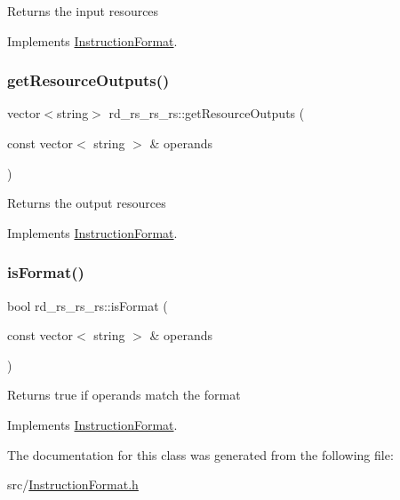 Returns the input resources 

Implements \hyperlink{classInstructionFormat_a09775d3a3c22f40a0f44504664e586e4}{Instruction\+Format}.

\mbox{\label{classrd__rs__rs__rs_ae8da7457b4ac57c9a2cc470ebb8da345}} 
\subsubsection{\texorpdfstring{get\+Resource\+Outputs()}{getResourceOutputs()}}
{\footnotesize\ttfamily vector$<$string$>$ rd\+\_\+rs\+\_\+rs\+\_\+rs\+::get\+Resource\+Outputs (\begin{DoxyParamCaption}\item[{const vector$<$ string $>$ \&}]{operands }\end{DoxyParamCaption})\hspace{0.3cm}{\ttfamily [virtual]}}

Returns the output resources 

Implements \hyperlink{classInstructionFormat_a95cd28ffb1bde59b67f676880ab10536}{Instruction\+Format}.

\mbox{\label{classrd__rs__rs__rs_adb8dd9ede11ef73c82f331d8ab25ad02}} 
\subsubsection{\texorpdfstring{is\+Format()}{isFormat()}}
{\footnotesize\ttfamily bool rd\+\_\+rs\+\_\+rs\+\_\+rs\+::is\+Format (\begin{DoxyParamCaption}\item[{const vector$<$ string $>$ \&}]{operands }\end{DoxyParamCaption})\hspace{0.3cm}{\ttfamily [virtual]}}

Returns true if operands match the format 

Implements \hyperlink{classInstructionFormat_a9fdcf94dcd7d9a55ba86e7a63f04d1fe}{Instruction\+Format}.



The documentation for this class was generated from the following file\+:\begin{DoxyCompactItemize}
\item 
src/\hyperlink{InstructionFormat_8h}{Instruction\+Format.\+h}\end{DoxyCompactItemize}
